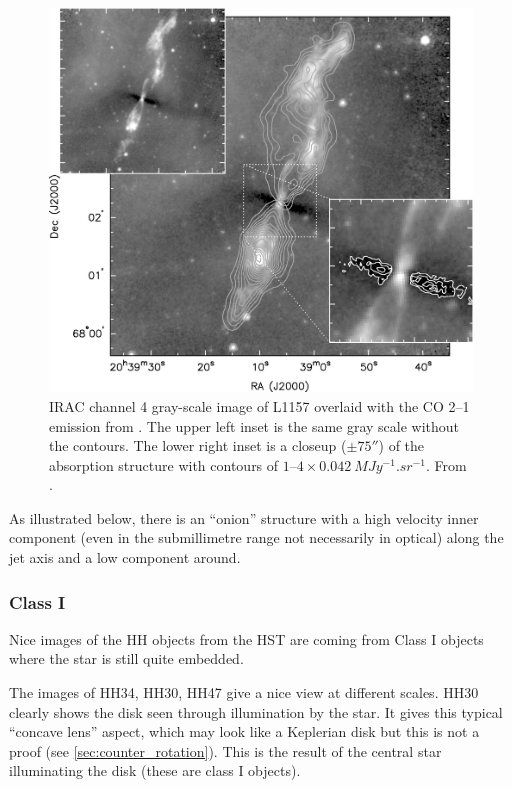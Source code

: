 \documentclass[10pt,a4paper,english]{article}
\begin{document}
\begin{figure}[!ht]
  \begin{center}
    \includegraphics[]{figures/looney2007.jpg}
    \caption{IRAC channel 4 gray-scale image of L1157 overlaid with the CO 2–1 emission from \cite{Bachiller2001}. The upper left inset is the same gray scale without the contours. The lower right inset is a closeup ($\pm\ang{;;75}$) of the absorption structure with contours of $\numrange{1}{4} \times \SI{0.042}{MJy^{-1}.sr^{-1}}$. From \cite{Looney2007}.}
  \end{center}
\end{figure}

As illustrated below, there is an ``onion'' structure with a high velocity
inner component (even in the submillimetre range not necessarily in optical)
along the jet axis and a low component around.


\subsubsection{Class I}

Nice images of the HH objects from the HST are coming from Class I objects
where the star is still quite embedded.


The images of HH34, HH30, HH47 give a nice view at different scales. HH30
clearly shows the disk seen through illumination by the star. It gives this
typical ``concave lens'' aspect, which may look like a Keplerian disk but this
is not a proof (see \autoref{sec:counter_rotation}). This is the result of the
central star illuminating the disk (these are class I objects).
\end{document}
